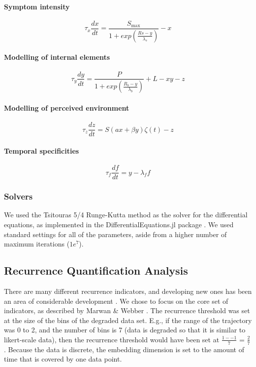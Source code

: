 \documentclass[utf8]{FrontiersinVancouver}
\begin{document}
\paragraph{Symptom intensity}
\begin{equation}
    \tau_{x}\frac{dx}{dt} = \frac{S_{\max}}{1+exp(\frac{Rs-y}{\lambda_{s}})} - x
\end{equation}


\paragraph{Modelling of internal elements}
\begin{equation}
    \tau_{y}\frac{dy}{dt} = \frac{P}{1+exp(\frac{R_{b}-y}{\lambda_{b}})} + L - xy - z
\end{equation}

\paragraph{Modelling of perceived environment}
\begin{equation}
    \tau_{z}\frac{dz}{dt} = S(ax + \beta y)\zeta(t) - z
\end{equation}


\paragraph{Temporal specificities}
\begin{equation}
    \tau_f\frac{df}{dt} = y - \lambda_f f
\end{equation}

\subsubsection{Solvers}
We used the Tsitouras 5/4 Runge-Kutta method as the solver for the differential equations, as implemented in the DifferentialEquations.jl package \citep{tsitourasRungeKuttaPairs2011}. We used standard settings for all of the parameters, aside from a higher number of maximum iterations ($1e^{7}$).  

\subsection{Recurrence Quantification Analysis}

There are many different recurrence indicators, and developing new ones has been an area of considerable development \citep{marwanTrendsRecurrenceAnalysis2023}. We chose to focus on the core set of indicators, as described by Marwan \& Webber \citep{marwanMathematicalComputationalFoundations2015}. The recurrence threshold was set at the size of the bins of the degraded data set. E.g., if the range of the trajectory was 0 to 2, and the number of bins is 7 (data is degraded so that it is similar to likert-scale data), then the recurrence threshold would have been set at $\frac{1--1}{7}$ = $\frac{2}{7}$. Because the data is discrete, the embedding dimension is set to the amount of time that is covered by one data point. 
\end{document}
